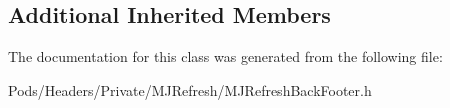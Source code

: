 \subsection*{Additional Inherited Members}


The documentation for this class was generated from the following file\+:\begin{DoxyCompactItemize}
\item 
Pods/\+Headers/\+Private/\+M\+J\+Refresh/M\+J\+Refresh\+Back\+Footer.\+h\end{DoxyCompactItemize}
